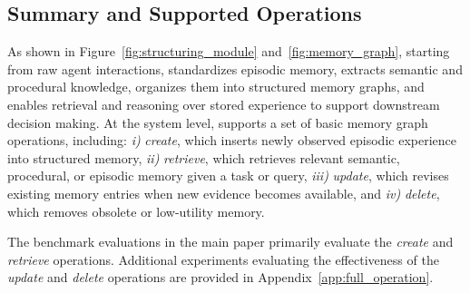 \subsection{Summary and Supported Operations}
\label{subsec:summary}
As shown in Figure~\ref{fig:structuring_module} and~\ref{fig:memory_graph}, starting from raw agent interactions, \plugmem standardizes episodic memory, extracts semantic and procedural knowledge, organizes them into structured memory graphs, and enables retrieval and reasoning over stored experience to support downstream decision making.
At the system level, \plugmem supports a set of basic memory graph operations, including: \textit{i)} \emph{create}, which inserts newly observed episodic experience into structured memory, \textit{ii)} \emph{retrieve}, which retrieves relevant semantic, procedural, or episodic memory given a task or query, \textit{iii)} \emph{update}, which revises existing memory entries when new evidence becomes available, and \textit{iv)} \emph{delete}, which removes obsolete or low-utility memory.

The benchmark evaluations in the main paper primarily evaluate the \emph{create} and \emph{retrieve} operations.
Additional experiments evaluating the effectiveness of the \emph{update} and \emph{delete} operations are provided in Appendix~\ref{app:full_operation}.
